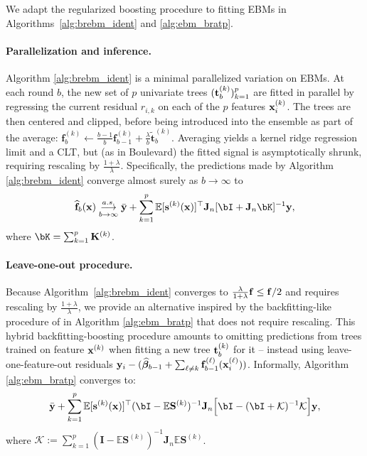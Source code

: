     We adapt the regularized boosting procedure to fitting EBMs in Algorithms~\ref{alg:brebm_ident} and \ref{alg:ebm_bratp}. 
    
    \paragraph{Parallelization and inference.} Algorithm \ref{alg:brebm_ident} is a minimal parallelized variation on EBMs. At each round $b$, the new set of $p$ univariate trees $(\mathbf{t}_b^{(k)})_{k=1}^p$ are fitted in parallel by regressing the current residual $r_{i,k}$ on each of the $p$ features $\mathbf{x}_i^{(k)}$. The trees are then centered and clipped, before being introduced into the ensemble as part of the average: $\mathbf{f}_b^{(k)} \gets \frac{b-1}{b} \mathbf{f}_{b-1}^{(k)}+\frac{\lambda}{b} \widetilde{\mathbf{t}}_b^{(k)}$.
    Averaging yields a kernel ridge regression limit and a CLT, but (as in Boulevard) the fitted signal is asymptotically shrunk, requiring rescaling by $\frac{1+\lambda}{\lambda}$. Specifically, the predictions made by Algorithm \ref{alg:brebm_ident} converge almost surely as $b\to\infty$ to
	$$
	\widehat{\f}_b(\bx) \underset{b\to\infty}{\overset{a.s.}{\longrightarrow}} \bar{\by}+ \sum_{k=1}^{p}\E[\sveck(\bx)]^\top \jmat[\bI + \jmat\bK]^{-1}\by,
	$$
	where $\bK = \sum_{k=1}^{p} \Kmatk$. 
	
	\paragraph{Leave-one-out procedure.} Because Algorithm~\ref{alg:brebm_ident} converges to $\frac{\lambda}{1+\lambda} \mathbf{f} \leq \mathbf{f}/2$ and requires rescaling by $\frac{1+\lambda}{\lambda}$, we provide an alternative inspired by the backfitting-like procedure of \cite{fang2025statistical} in Algorithm \ref{alg:ebm_bratp} that does not require rescaling. This hybrid backfitting-boosting procedure amounts to omitting predictions from trees trained on feature $\mathbf{x}^{(k)}$ when fitting a new tree $\mathbf{t}_{b}^{(k)}$ for it -- instead using leave-one-feature-out residuals $\mathbf{y}_i - (\widehat{\bm{\beta}}_{b-1}+\sum_{\ell\neq k}\mathbf{f}_{b-1}^{(\ell)}(\mathbf{x}_i^{(\ell)}))$. Informally, Algorithm \ref{alg:ebm_bratp} converges to:
	$$
	\bar{\by}+ \sum_{k=1}^{p}\E[\sveck(\bx)]^\top (\bI - \E\Smatk)^{-1} \jmat\Big[\bI-(\bI+\mathcal{K})^{-1}\mathcal{K}\Big]\by,
	$$
    where $\mathcal{K}:=\sum_{k=1}^p(\mathbf{I}-\mathbb{E} \mathbf{S}^{(k)})^{-1} \mathbf{J}_n \mathbb{E} \mathbf{S}^{(k)}$. 
	
